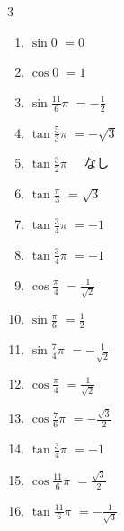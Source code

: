 \begin{multicols}{3}
\begin{enumerate}
  \item $\displaystyle \sin{0}$
        $\displaystyle =0$

  \item $\displaystyle \cos{0}$
        $\displaystyle =1$

  \item $\displaystyle \sin{\frac{11}{6}\pi}$
        $\displaystyle =-\frac{1}{2}$

  \item $\displaystyle \tan{\frac{5}{3}\pi}$
        $\displaystyle =-\sqrt{3}$

  \item $\displaystyle \tan{\frac{3}{2}\pi}$
        $\displaystyle \quad なし$

\columnbreak %

  \item $\displaystyle \tan{\frac{\pi}{3}}$
        $\displaystyle =\sqrt{3}$

  \item $\displaystyle \tan{\frac{3}{4}\pi}$
        $\displaystyle =-1$

  \item $\displaystyle \tan{\frac{3}{4}\pi}$
        $\displaystyle =-1$

  \item $\displaystyle \cos{\frac{\pi}{4}}$
        $\displaystyle =\frac{1}{\sqrt{2}}$

  \item $\displaystyle \sin{\frac{\pi}{6}}$
        $\displaystyle =\frac{1}{2}$

  \item $\displaystyle \sin{\frac{7}{4}\pi}$
        $\displaystyle =-\frac{1}{\sqrt{2}}$

  \item $\displaystyle \cos{\frac{\pi}{4}}$
        $\displaystyle =\frac{1}{\sqrt{2}}$

  \item $\displaystyle \cos{\frac{7}{6}\pi}$
        $\displaystyle =-\frac{\sqrt{3}}{2}$

  \item $\displaystyle \tan{\frac{3}{4}\pi}$
        $\displaystyle =-1$

  \item $\displaystyle \cos{\frac{11}{6}\pi}$
        $\displaystyle =\frac{\sqrt{3}}{2}$

  \item $\displaystyle \tan{\frac{11}{6}\pi}$
        $\displaystyle =-\frac{1}{\sqrt{3}}$


\end{enumerate}
\end{multicols}
